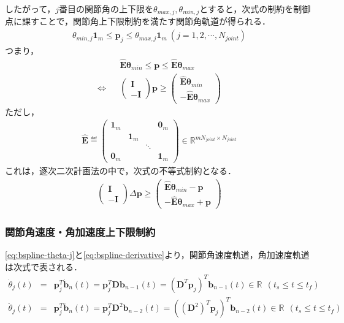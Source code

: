 したがって，$j$番目の関節角の上下限を$\theta_{max,j}, \theta_{min,j}$とすると，次式の制約を制御点に課すことで，関節角上下限制約を満たす関節角軌道が得られる．
\begin{eqnarray}
  \theta_{min,j} \bm{1}_m \leq \bm{p}_j \leq \theta_{max,j} \bm{1}_m \ (j = 1,2,\cdots,N_{\mathit{joint}})
\end{eqnarray}
つまり，
\begin{eqnarray}
  &&\bm{\hat{E}} \bm{\theta}_{min} \leq \bm{p} \leq \bm{\hat{E}} \bm{\theta}_{max} \label{eq:bspline-theta-constraint} \\
  \Leftrightarrow&&
  \begin{pmatrix} \bm{I} \\ - \bm{I} \end{pmatrix} \bm{p} \geq \begin{pmatrix} \bm{\hat{E}} \bm{\theta}_{min} \\ - \bm{\hat{E}} \bm{\theta}_{max} \end{pmatrix}
\end{eqnarray}
ただし，
\begin{eqnarray}
  \bm{\hat{E}} \eqdef \begin{pmatrix} \bm{1}_m&&&\bm{0}_m\\&\bm{1}_m&&\\&&\ddots&\\\bm{0}_m&&&\bm{1}_m \end{pmatrix} \in \mathbb{R}^{m N_{\mathit{joint}} \times N_{\mathit{joint}}}
\end{eqnarray}
これは，逐次二次計画法の中で，次式の不等式制約となる．
\begin{eqnarray}
  \begin{pmatrix} \bm{I} \\ - \bm{I} \end{pmatrix} \Delta \bm{p} \geq \begin{pmatrix} \bm{\hat{E}} \bm{\theta}_{min} - \bm{p} \\ - \bm{\hat{E}} \bm{\theta}_{max} + \bm{p} \end{pmatrix}
\end{eqnarray}

\subsubsection*{関節角速度・角加速度上下限制約}

\eqref{eq:bspline-theta-j}と\eqref{eq:bspline-derivative}より，関節角速度軌道，角加速度軌道は次式で表される．
\begin{eqnarray}
  \dot{\theta}_j (t) &=& \bm{p}_j^T \bm{\dot{b}}_n(t) = \bm{p}_j^T \bm{D} \bm{b}_{n-1}(t) = (\bm{D}^T \bm{p}_j)^T \bm{b}_{n-1}(t) \in \mathbb{R} \ \ (t_s \leq t \leq t_f) \label{eq:bspline-vel-j} \\
  \ddot{\theta}_j (t) &=& \bm{p}_j^T \bm{\ddot{b}}_n(t) = \bm{p}_j^T \bm{D}^2 \bm{b}_{n-2}(t) = ((\bm{D}^2)^T \bm{p}_j)^T \bm{b}_{n-2}(t) \in \mathbb{R} \ \ (t_s \leq t \leq t_f) \label{eq:bspline-acc-j}
\end{eqnarray}

